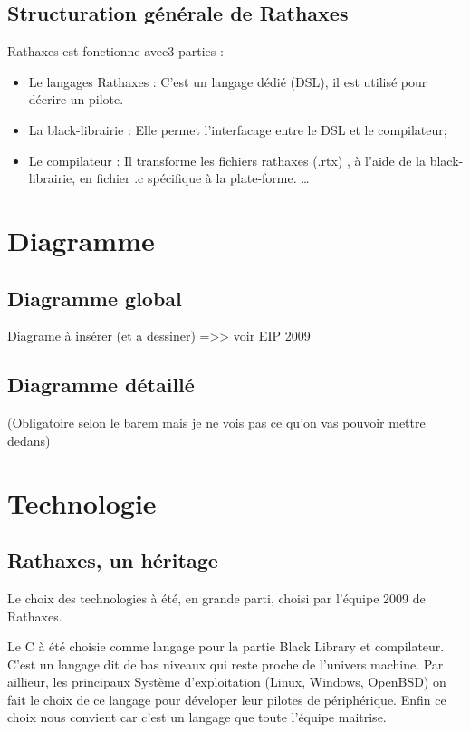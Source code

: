 \documentclass{rtxreport}
\begin{document}
\section{Structuration générale de Rathaxes}

Rathaxes est fonctionne avec3 parties :

\begin{itemize}
        \item Le langages Rathaxes : C'est un langage dédié (DSL), il est utilisé pour décrire un pilote.
        \item La black-librairie :  Elle permet l'interfacage entre le DSL et le compilateur;
        \item Le compilateur : Il transforme les fichiers rathaxes (.rtx) , à l'aide de la black-librairie, en fichier .c spécifique à la plate-forme. \ldots
\end{itemize}

\chapter{Diagramme}

\section{Diagramme global}

Diagrame à insérer (et a dessiner) 
=>> voir EIP 2009


\section{Diagramme détaillé}

(Obligatoire selon le barem mais je ne vois pas ce qu'on vas pouvoir mettre dedans)

\chapter{Technologie}

\section{Rathaxes, un héritage}
Le choix des technologies à été, en grande parti, choisi par l'équipe 2009 de Rathaxes.

Le C à été choisie comme langage pour la partie Black Library et compilateur. 
C'est un langage dit de bas niveaux qui reste proche de l'univers machine.
Par aillieur, les principaux Système d'exploitation (Linux, Windows, OpenBSD) on fait le choix de ce langage pour déveloper leur pilotes de périphérique.
Enfin ce choix nous convient car c'est un langage que toute l'équipe maitrise.
\end{document}
